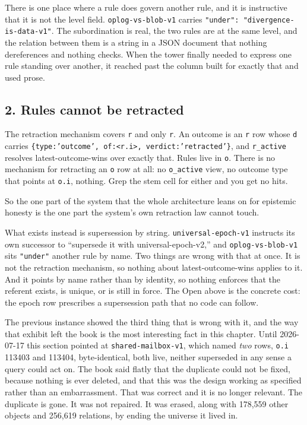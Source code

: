 There is one place where a rule does govern another rule, and it is instructive that it is not the level field. \texttt{oplog-vs-blob-v1} carries \texttt{"under": "divergence-is-data-v1"}. The subordination is real, the two rules are at the same level, and the relation between them is a string in a JSON document that nothing dereferences and nothing checks. When the tower finally needed to express one rule standing over another, it reached past the column built for exactly that and used prose.

\subsection*{2. Rules cannot be retracted}

The retraction mechanism covers \texttt{r} and only \texttt{r}. An outcome is an \texttt{r} row whose \texttt{d} carries \texttt{\{type:'outcome', of:<r.i>, verdict:'retracted'\}}, and \texttt{r\_active} resolves latest-outcome-wins over exactly that. Rules live in \texttt{o}. There is no mechanism for retracting an \texttt{o} row at all: no \texttt{o\_active} view, no outcome type that points at \texttt{o.i}, nothing. Grep the stem cell for either and you get no hits.

So the one part of the system that the whole architecture leans on for epistemic honesty is the one part the system's own retraction law cannot touch.

What exists instead is supersession by string. \texttt{universal-epoch-v1} instructs its own successor to ``supersede it with universal-epoch-v2,'' and \texttt{oplog-vs-blob-v1} sits \texttt{"under"} another rule by name. Two things are wrong with that at once. It is not the retraction mechanism, so nothing about latest-outcome-wins applies to it. And it points by name rather than by identity, so nothing enforces that the referent exists, is unique, or is still in force. The Open above is the concrete cost: the epoch row prescribes a supersession path that no code can follow.

The previous instance showed the third thing that is wrong with it, and the way that exhibit left the book is the most interesting fact in this chapter. Until 2026-07-17 this section pointed at \texttt{shared-mailbox-v1}, which named \emph{two} rows, \texttt{o.i} 113403 and 113404, byte-identical, both live, neither superseded in any sense a query could act on. The book said flatly that the duplicate could not be fixed, because nothing is ever deleted, and that this was the design working as specified rather than an embarrassment. That was correct and it is no longer relevant. The duplicate is gone. It was not repaired. It was erased, along with 178,559 other objects and 256,619 relations, by ending the universe it lived in.

